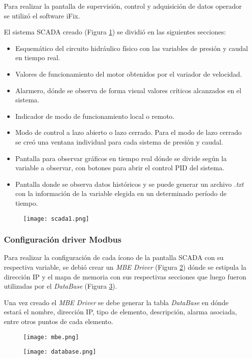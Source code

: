 Para realizar la pantalla de supervisión, control y adquisición de datos operador se utilizó el software iFix.

El sistema SCADA creado (Figura \ref{fig:scada1}) se dividió en las siguientes secciones:
\begin{itemize}
	\item Esquemático del circuito hidráulico físico con las variables de presión y caudal en tiempo real.
	\item Valores de funcionamiento del motor obtenidos por el variador de velocidad.
	\item Alarmero, dónde se observa de forma visual valores críticos alcanzados en el sistema.
	\item Indicador de modo de funcionamiento local o remoto.
	\item Modo de control a lazo abierto o lazo cerrado.
	\subitem Para el modo de lazo cerrado se creó una ventana individual para cada sistema de presión y caudal.
	\item Pantalla para observar gráficos en tiempo real dónde se divide según la variable a observar, con botones para abrir el control PID del sistema.
	\item Pantalla donde se observa datos históricos y se puede generar un archivo \textit{.txt} con la información de la variable elegida en un determinado período de tiempo.
\end{itemize} 

\begin{figure}[h!]
	\centering
	\texttt{[image: scada1.png]}
	\label{fig:scada1}
\end{figure}


\subsubsection{Configuración driver Modbus}
Para realizar la configuración de cada ícono de la pantalla SCADA con su respectiva variable, se debió crear un \textit{MBE Driver} (Figura \ref{fig:mbe}) dónde se estipula la dirección IP y el mapa de memoria con sus respectivas secciones que luego fueron utilizadas por el \textit{DataBase} (Figura \ref{fig:database}). 

Una vez creado el \textit{MBE Driver} se debe generar la tabla \textit{DataBase} en dónde estará el nombre, dirección IP, tipo de elemento, descripción, alarma asociada, entre otros puntos de cada elemento.

\begin{figure}[h!]
	\centering
	\texttt{[image: mbe.png]}
	\label{fig:mbe}
\end{figure}
\begin{figure}[h!]
	\centering
	\texttt{[image: database.png]}
	\label{fig:database}
\end{figure}


